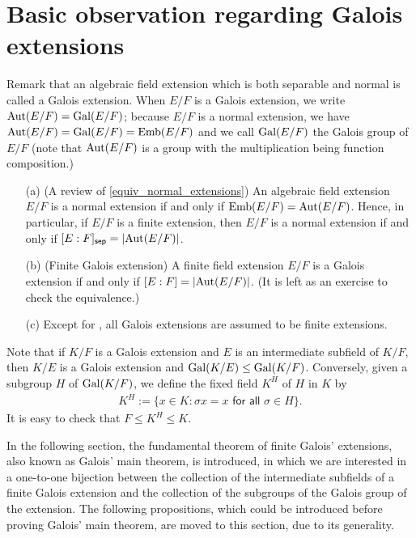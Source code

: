 \section{Basic observation regarding Galois extensions}

Remark that an algebraic field extension which is both separable and normal is called a Galois extension.
When $E/F$ is a Galois extension, we write ${\textrm{Aut}({E/F})}={\textrm{Gal}({E/F})}$; because $E/F$ is a normal extension, we have ${\textrm{Aut}({E/F})}={\textrm{Gal}({E/F})}={\textrm{Emb}({E/F})}$ and we call ${\textrm{Gal}({E/F})}$ the Galois group of $E/F$ (note that ${\textrm{Aut}({E/F})}$ is a group with the multiplication being function composition.)
\begin{rmk}
    \begin{enumerate}
        \item[(a)]
        {
            (A review of \cref{equiv_normal_extensions})
            An algebraic field extension $E/F$ is a normal extension if and only if ${\textrm{Emb}({E/F})}={\textrm{Aut}({E/F})}$.
            Hence, in particular, if $E/F$ is a finite extension, then $E/F$ is a normal extension if and only if $[E:F]_{\textsf{sep}}=|{\textrm{Aut}({E/F})}|$.
        }
        \item[(b)]
        {
            (Finite Galois extension)
            A finite field extension $E/F$ is a Galois extension if and only if $[E:F]=|{\textrm{Aut}({E/F})}|$.
            \color{brown}(It is left as an exercise to check the equivalence.)\color{black}
        }
        \item[(c)]
        {
            Except for , all Galois extensions are assumed to be finite extensions.
        }
    \end{enumerate}
\end{rmk}

Note that if $K/F$ is a Galois extension and $E$ is an intermediate subfield of $K/F$, then $K/E$ is a Galois extension and ${\textrm{Gal}({K/E})}\leq{\textrm{Gal}({K/F})}$.
Conversely, given a subgroup $H$ of ${\textrm{Gal}({K/F})}$, we define the fixed field $K^H$ of $H$ in $K$ by
\begin{align*}
    K^H:=\{x\in K: \textsf{$\sigma x=x$ for all $\sigma\in H$}\}.
\end{align*}
It is easy to check that $F\leq K^H\leq K$.

In the following section, the fundamental theorem of finite Galois' extensions, also known as Galois' main theorem, is introduced, in which we are interested in a one-to-one bijection between the collection of the intermediate subfields of a finite Galois extension and the collection of the subgroups of the Galois group of the extension.
The following propositions, which could be introduced before proving Galois' main theorem, are moved to this section, due to its generality.


